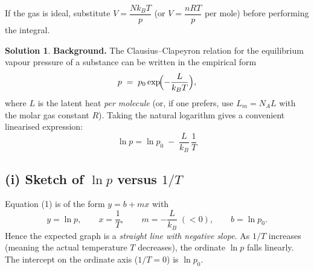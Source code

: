 \documentclass[12pt]{article}
\theoremstyle{definition} %
\newtheorem{solution}{Solution}
\theoremstyle{plain} %
\begin{document}
                    If the gas is ideal, substitute \(V = \dfrac{Nk_B T}{p}\) (or \(V = \dfrac{nRT}{p}\) per mole) before performing the integral.
                    \begin{solution}
                      \textbf{Background.}
                      The Clausius–Clapeyron relation for the equilibrium vapour pressure of a
                      substance can be written in the empirical form
                      \[
                        p \;=\; p_0 \exp\!\Bigl(-\frac{L}{k_B T}\Bigr),
                      \]
                      where \(L\) is the latent heat \emph{per molecule} (or, if one prefers, use
                      \(L_m = N_A L\) with the molar gas constant \(R\)).  Taking the natural
                      logarithm gives a convenient linearised expression:
                      \[
                        \boxed{\;
                        \ln p = \ln p_0 \;-\;\frac{L}{k_B}\,\frac{1}{T}
                        \;}
                        \tag{1}
                      \]
                      
                      \subsection*{(i) Sketch of \(\ln p\) versus \(1/T\)}
                      Equation (1) is of the form \(y = b + mx\) with
                      \[
                        y = \ln p,
                        \qquad
                        x = \frac{1}{T},
                        \qquad
                        m = -\frac{L}{k_B}\;(<0),
                        \qquad
                        b = \ln p_0.
                      \]
                      Hence the expected graph is a \emph{straight line with negative slope}.  
                      As \(1/T\) increases (meaning the actual temperature \(T\) decreases),
                      the ordinate \(\ln p\) falls linearly.  The intercept on the ordinate axis
                      (\(1/T = 0\)) is \(\ln p_0\).
                      
                      \begin{center}
                      \end{center}
                      

\end{solution}
\end{document}
